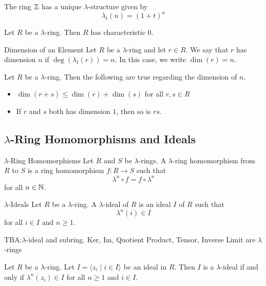 \documentclass[a4paper]{article}
\begin{document}
\begin{prp}{}{} The ring $\mathbb{Z}$ has a unique $\lambda$-structure given by $$\lambda_t(n)=(1+t)^n$$
\end{prp}

\begin{prp}{}{} Let $R$ be a $\lambda$-ring. Then $R$ has characteristic $0$. 
\end{prp}

\begin{defn}{Dimension of an Element}{} Let $R$ be a $\lambda$-ring and let $r\in R$. We say that $r$ has dimension $n$ if $\deg(\lambda_t(r))=n$. In this case, we write $\dim(r)=n$. 
\end{defn}

\begin{prp}{}{} Let $R$ be a $\lambda$-ring. Then the following are true regarding the dimension of $n$. 
\begin{itemize}
\item $\dim(r+s)\leq\dim(r)+\dim(s)$ for all $r,s\in R$
\item If $r$ and $s$ both has dimension $1$, then so is $rs$. 
\end{itemize}
\end{prp}

\subsection{$\lambda$-Ring Homomorphisms and Ideals}
\begin{defn}{$\lambda$-Ring Homomorphisms}{} Let $R$ and $S$ be $\lambda$-rings. A $\lambda$-ring homomorphism from $R$ to $S$ is a ring homomorphism $f:R\to S$ such that $$\lambda^n\circ f=f\circ\lambda^n$$ for all $n\in\mathbb{N}$. 
\end{defn}

\begin{defn}{$\lambda$-Ideals}{} Let $R$ be a $\lambda$-ring. A $\lambda$-ideal of $R$ is an ideal $I$ of $R$ such that $$\lambda^n(i)\in I$$ for all $i\in I$ and $n\geq 1$. 
\end{defn}

TBA:$\lambda$-ideal and subring. Ker, Im, Quotient Product, Tensor, Inverse Limit are $\lambda$-rings

\begin{prp}{}{} Let $R$ be a $\lambda$-ring. Let $I=\langle z_i\;|\;i\in I\rangle$ be an ideal in $R$. Then $I$ is a $\lambda$-ideal if and only if $\lambda^n(z_i)\in I$ for all $n\geq 1$ and $i\in I$. 
\end{prp}
\end{document}

